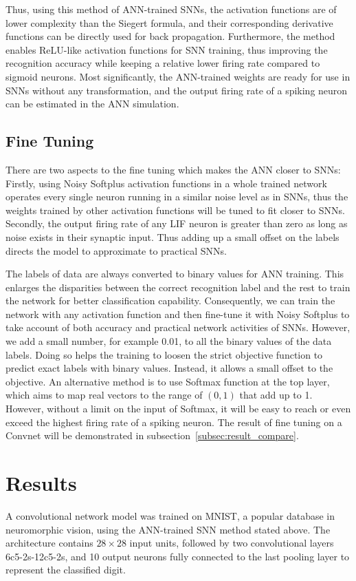 \documentclass{article}
\begin{document}
Thus, using this method of ANN-trained SNNs, the activation functions are of lower complexity than the Siegert formula, and their corresponding derivative functions can be directly used for back propagation.
Furthermore, the method enables ReLU-like activation functions for SNN training, thus improving the recognition accuracy while keeping a relative lower firing rate compared to sigmoid neurons. 
Most significantly, the ANN-trained weights are ready for use in SNNs without any transformation, and the output firing rate of a spiking neuron can be estimated in the ANN simulation.


\subsection{Fine Tuning}
There are two aspects to the fine tuning which makes the ANN closer to SNNs:
Firstly, using Noisy Softplus activation functions in a whole trained network operates every single neuron running in a similar noise level as in SNNs, thus the weights trained by other activation functions will be tuned to fit closer to SNNs.
Secondly, the output firing rate of any LIF neuron is greater than zero as long as noise exists in their synaptic input.
Thus adding up a small offset on the labels directs the model to approximate to practical SNNs. 

The labels of data are always converted to binary values for ANN training.
This enlarges the disparities between the correct recognition label and the rest to train the network for better classification capability.
Consequently, we can train the network with any activation function and then fine-tune it with Noisy Softplus to take account of both accuracy and practical network activities of SNNs.
However, we add a small number, for example 0.01, to all the binary values of the data labels.
Doing so helps the training to loosen the strict objective function to predict exact labels with binary values.
Instead, it allows a small offset to the objective.
An alternative method is to use Softmax function at the top layer, which aims to map real vectors to the range of $(0,1)$ that add up to 1. 
However, without a limit on the input of Softmax, it will be easy to reach or even exceed the highest firing rate of a spiking neuron.
The result of fine tuning on a Convnet will be demonstrated in subsection~\ref{subsec:result_compare}.


\section{Results}
\label{sec:iconipResult}
A convolutional network model was trained on MNIST,
a popular database in neuromorphic vision, using the ANN-trained SNN method stated above.
The architecture contains $28\times28$ input units, followed by two convolutional layers 6c5-2s-12c5-2s, and 10 output neurons fully connected to the last pooling layer to represent the classified digit.
\end{document}
